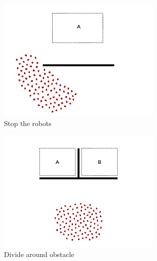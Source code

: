 \documentclass[]{article}
\begin{document}
\begin{figure}
\begin{subfigure}{0.42\textwidth}
		\includegraphics[width=\linewidth]{slide_images/Swarm_Robot_Control_-_100_Robot_0007.png}
		\caption{Stop the robots}
		\label{fig:sub1}
	\end{subfigure}%
	\begin{subfigure}{0.42\textwidth}
		\centering
		\includegraphics[width=\linewidth]{slide_images/Swarm_Robot_Control_-_100_Robot_0009.png}
		\caption{Divide around obstacle}
		\label{fig:sub2}
	\end{subfigure}
	\begin{subfigure}{0.42\textwidth}
		\centering

\end{subfigure}
\end{figure}
\end{document}

